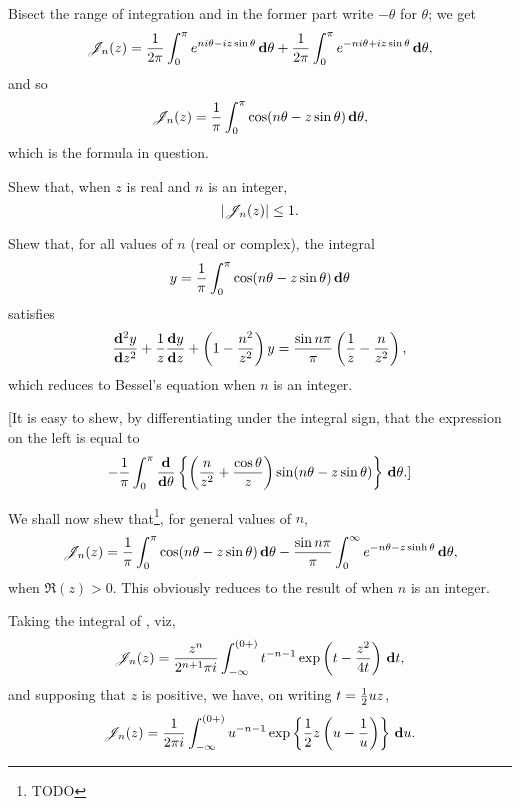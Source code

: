 Bisect the range of integration and in the former part write 
$-\theta$ for $\theta$; we get
$$
\mathscr{J}_{n}(z) 
=
\frac{1}{2\pi}
\int_{0}^{\pi}
e^{n i \theta - i z \sin\theta}
\, \mathbf{d} \theta
+
\frac{1}{2\pi}
\int_{0}^{\pi}
e^{-n i \theta + i z \sin\theta}
\, \mathbf{d} \theta,
$$
and so
$$
\mathscr{J}_{n}(z)
=
\frac{1}{\pi}
\int_{0}^{\pi}
\cos (n \theta - z \sin \theta)
\, \mathbf{d} \theta,
$$
which is the formula in question.
\begin{wandwexample}
  Shew that, when $z$ is real and $n$ is an integer,
  $$
  \left|  \mathscr{J}_{n}(z)  \right| \leq 1.
  $$
\end{wandwexample}
\begin{wandwexample}
  Shew that, for all values of $n$ (real or complex), the integral
  $$
  y
  =
  \frac{1}{\pi}
  \int_{0}^{\pi}
  \cos (n \theta - z \sin \theta)
  \, \mathbf{d} \theta
  $$
  satisfies
  $$
  \frac{\mathbf{d}^{2} y}{\mathbf{d} z^{2}}
  +
  \frac{1}{z}
  \frac{\mathbf{d} y}{\mathbf{d} z}
  +
  \left(  1 - \frac{n^{2}}{z^{2}}  \right) y
  =
  \frac{ \sin n\pi }{\pi}
  \left(  \frac{1}{z} - \frac{n}{z^{2}}   \right),
  $$
  which reduces to Bessel's equation when $n$ is an integer.

  [It is easy to shew, by differentiating under the integral sign, that
  the expression on the left is equal to
  $$
  -
  \frac{1}{\pi}
  \int_{0}^{\pi}
  \frac{\mathbf{d}}{\mathbf{d}\theta}
  \left\{  \left(  \frac{n}{z^{2}} + \frac{\cos\theta}{z}   \right)
    \sin(n\theta - z \sin\theta) \right\}
  \, \mathbf{d} \theta
  .]
  $$
\end{wandwexample}
% 
We shall now shew that\footnote{TODO}, for general values of $n$,
\begin{equation}
  \mathscr{J}_{n}(z) 
  =
  \frac{1}{\pi}
  \int_{0}^{\pi} \cos(n\theta - z\sin\theta) \, \mathbf{d}\theta
  -
  \frac{\sin n\pi}{\pi}
  \int_{0}^{\infty} e^{-n\theta - z\sinh\theta} \, \mathbf{d}\theta,
\end{equation}
when $\Re(z) > 0$. This obviously reduces to the result of
 when $n$ is an integer.

Taking the integral of , viz,
$$
\mathscr{J}_{n}(z) 
=
\frac{z^{n}}{2^{n+1}\pi i}
\int_{-\infty}^{(0+)}
t^{-n-1}
\exp\left(  t - \frac{z^{2}}{4t}   \right)
\, \mathbf{d} t,
$$
% 
% 
and supposing that $z$ is positive, we have, on writing
$t = \frac{1}{2} u z$,
$$
\mathscr{J}_{n}(z) 
= 
\frac{1}{2\pi i} 
\int_{-\infty}^{(0+)}
u^{-n-1}
\exp \left\{  \frac{1}{2} z \left(  u - \frac{1}{u}   \right)   \right\}
\, \mathbf{d} u.
$$

